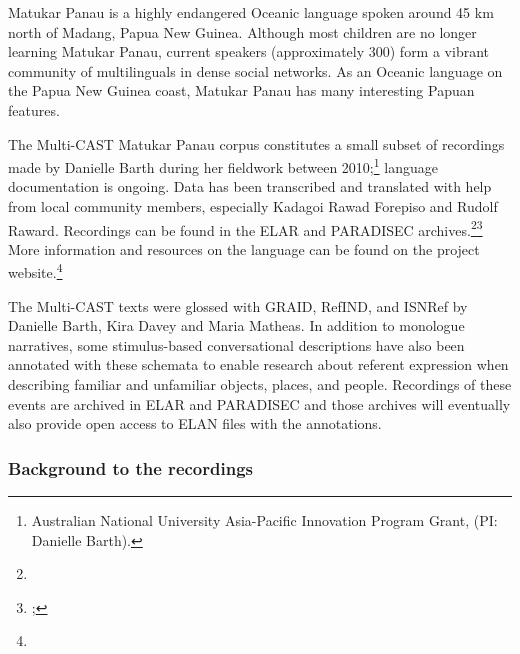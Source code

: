 \noindent Matukar Panau is a highly endangered Oceanic language spoken around 45 km north of Madang, Papua New Guinea. Although most children are no longer learning Matukar Panau, current speakers (approximately 300) form a vibrant community of multilinguals in dense social networks. As an Oceanic language on the Papua New Guinea coast, Matukar Panau has many interesting Papuan features.

The Multi-CAST Matukar Panau corpus constitutes a small subset of recordings made by Danielle Barth during her fieldwork between 2010;\footnote{Australian National University Asia-Pacific Innovation Program Grant,  (PI: Danielle Barth).} language documentation is ongoing. Data has been transcribed and translated with help from local community members, especially Kadagoi Rawad Forepiso and Rudolf Raward. Recordings can be found in the ELAR and PARADISEC archives.\footnote{}\footnote{; } More information and resources on the language can be found on the project website.\footnote{}

The Multi-CAST texts were glossed with GRAID, RefIND, and ISNRef by Danielle Barth, Kira Davey and Maria Matheas. In addition to monologue narratives, some stimulus-based conversational descriptions have also been annotated with these schemata to enable research about referent expression when describing familiar and unfamiliar objects, places, and people. Recordings of these events are archived in ELAR and PARADISEC and those archives will eventually also provide open access to ELAN files with the annotations.



\subsubsection*{Background to the recordings}


